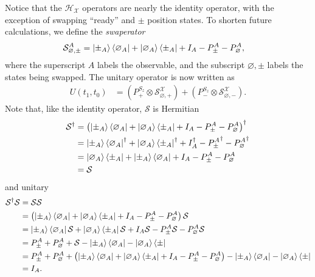 Notice that the $\mathcal{H}_\mathcal{X}$ operators are nearly the identity operator, with the exception of swapping ``ready'' and $\pm$ position states. To shorten future calculations, we define the \textit{swaperator}
\begin{align}
  \mathcal{S}^A_{\varnothing, \pm} &= \ket{\pm_A}\bra{\varnothing_A} + \ket{\varnothing_A}\bra{\pm_A} + I_A - P^A_\pm - P^A_\varnothing,
\end{align}
where the superscript $A$ labels the observable, and the subscript $\varnothing, \pm$ labels the states being swapped. The unitary operator is now written as
\begin{align}
  U(t_1, t_0) &= \left(P^{S_z}_+ \otimes \mathcal{S}^{\mathcal{X}}_{\varnothing, +}\right) + \left(P^{S_z}_- \otimes \mathcal{S}^{\mathcal{X}}_{\varnothing, -}\right).
\end{align}
Note that, like the identity operator, $\mathcal{S}$ is Hermitian
\begin{align}
  \mathcal{S}^\dagger &= \left(\ket{\pm_A}\bra{\varnothing_A} + \ket{\varnothing_A}\bra{\pm_A} + I_A - P^A_\pm - P^A_\varnothing \right)^\dagger \\ \nonumber
  &= \ket{\pm_A}\bra{\varnothing_A}^\dagger + \ket{\varnothing_A}\bra{\pm_A}^\dagger + I_A^\dagger - {P^A_\pm}^\dagger - {P^A_\varnothing}^\dagger \\ \nonumber
  &= \ket{\varnothing_A}\bra{\pm_A} + \ket{\pm_A}\bra{\varnothing_A} + I_A - P^A_\pm - P^A_\varnothing \\ \nonumber
  &=\mathcal{S}
\end{align}
and unitary
\begin{align}
  \mathcal{S}^\dagger \mathcal{S} &= \mathcal{S}\mathcal{S} \\ \nonumber
  &= \left(\ket{\pm_A}\bra{\varnothing_A} + \ket{\varnothing_A}\bra{\pm_A} + I_A - P^A_\pm - P^A_\varnothing \right) \mathcal{S} \\ \nonumber
  &= \ket{\pm_A}\bra{\varnothing_A}\mathcal{S} + \ket{\varnothing_A}\bra{\pm_A} \mathcal{S} + I_A\mathcal{S} - P^A_\pm\mathcal{S} - P^A_\varnothing \mathcal{S} \\ \nonumber
  &= P^A_\pm  + P^A_\varnothing  + \mathcal{S} -\ket{\pm_A}\bra{\varnothing_A} -\ket{\varnothing_A}\bra{\pm} \\ \nonumber
  &= P^A_\pm  + P^A_\varnothing  + \left(\ket{\pm_A}\bra{\varnothing_A} + \ket{\varnothing_A}\bra{\pm_A} + I_A - P^A_\pm - P^A_\varnothing \right) -\ket{\pm_A}\bra{\varnothing_A} -\ket{\varnothing_A}\bra{\pm} \\ \nonumber
  &= I_A.
\end{align}
